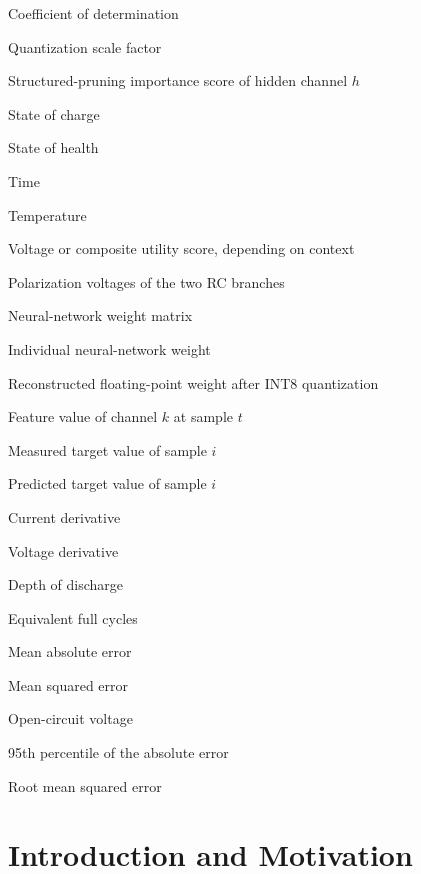 \documentclass[
    a4paper,
    12pt,
    titlepage,
    bibliography=totoc,
    twoside=on,
    parskip=false,
    numbers=noenddot,
    cleardoublepage=empty,
    DIV=12,
    BCOR=12.0mm,
    headheight=36pt,
    headings=openright
]{scrreprt}
\newcommand{\chapterrole}[1]{}
\begin{document}
\begin{description}[style=nextline,leftmargin=3.2cm]
\item[$R^2$] Coefficient of determination
\item[$s$] Quantization scale factor
\item[$s_h$] Structured-pruning importance score of hidden channel $h$
\item[$SOC$] State of charge
\item[$SOH$] State of health
\item[$t$] Time
\item[$T$] Temperature
\item[$U$] Voltage or composite utility score, depending on context
\item[$U_1,U_2$] Polarization voltages of the two RC branches
\item[$W$] Neural-network weight matrix
\item[$w$] Individual neural-network weight
\item[$\hat{w}$] Reconstructed floating-point weight after INT8 quantization
\item[$x_{t,k}$] Feature value of channel $k$ at sample $t$
\item[$y_i$] Measured target value of sample $i$
\item[$\hat{y}_i$] Predicted target value of sample $i$
\item[$\mathrm{d}I/\mathrm{d}t$] Current derivative
\item[$\mathrm{d}U/\mathrm{d}t$] Voltage derivative
\item[$\mathrm{DoD}$] Depth of discharge
\item[$\mathrm{EFC}$] Equivalent full cycles
\item[$\mathrm{MAE}$] Mean absolute error
\item[$\mathrm{MSE}$] Mean squared error
\item[$\mathrm{OCV}$] Open-circuit voltage
\item[$\mathrm{P95}$] 95th percentile of the absolute error
\item[$\mathrm{RMSE}$] Root mean squared error
\end{description}

\listoffigures
{}
\listoftables
{}

\cleardoublepage
{}

\chapter{Introduction and Motivation}
\label{chap:introduction}
\chapterrole{}
\end{document}
